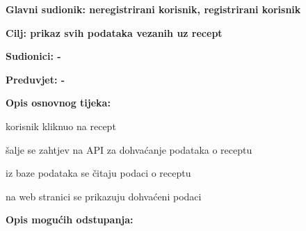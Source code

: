 					\noindent {}
					\begin{packed_item}
						\item \textbf{Glavni sudionik: neregistrirani korisnik, registrirani korisnik}
						\item  \textbf{Cilj: prikaz svih podataka vezanih uz recept}
						\item  \textbf{Sudionici: -}
						\item  \textbf{Preduvjet: -}
						
						\item  \textbf{Opis osnovnog tijeka:}
						\item[] \begin{packed_enum}
							\item korisnik kliknuo na recept
							\item šalje se zahtjev na API za dohvaćanje podataka o receptu
							\item iz baze podataka se čitaju podaci o receptu
							\item na web stranici se prikazuju dohvaćeni podaci
						\end{packed_enum}
						
						\item  \textbf{Opis mogućih odstupanja:}
						\item[] \begin{packed_item}							
						\end{packed_item}
					\end{packed_item}
					
					
					
